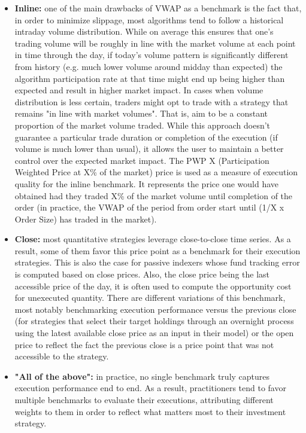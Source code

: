 \begin{itemize}
\item \textbf{Inline:} one of the main drawbacks of VWAP as a benchmark is the fact that, in order to minimize slippage, most algorithms tend to follow a historical intraday volume distribution. While on average this ensures that one's trading volume will be roughly in line with the market volume at each point in time through the day, if today's volume pattern is significantly different from history (e.g. much lower volume around midday than expected) the algorithm participation rate at that time might end up being higher than expected and result in higher market impact. In cases when volume distribution is less certain, traders might opt to trade with a strategy that remains "in line with market volumes". That is, aim to be a constant proportion of the market volume traded. While this approach doesn't guarantee a particular trade duration or completion of the execution (if volume is much lower than usual), it allows the user to maintain a better control over the expected market impact. The PWP X (Participation Weighted Price at X\% of the market) price is used as a measure of execution quality for the inline benchmark. It represents the price one would have obtained had they traded X\% of the market volume until completion of the order (in practice, the VWAP of the period from order start until (1/X x Order Size) has traded in the market).

\item \textbf{Close:} most quantitative strategies leverage close-to-close time series. As a result, some of them favor this price point as a benchmark for their execution strategies. This is also the case for passive indexers whose fund tracking error is computed based on close prices. Also, the close price being the last accessible price of the day, it is often used to compute the opportunity cost for unexecuted quantity. 
There are different variations of this benchmark, most notably benchmarking execution performance versus the previous close (for strategies that select their target holdings through an overnight process using the latest available close price as an input in their model) or the open price to reflect the fact the previous close is a price point that was not accessible to the strategy.

\item \textbf{"All of the above":} in practice, no single benchmark truly captures execution performance end to end. As a result, practitioners tend to favor multiple benchmarks to evaluate their executions, attributing different weights to them in order to reflect what matters most to their investment strategy.
\end{itemize}

